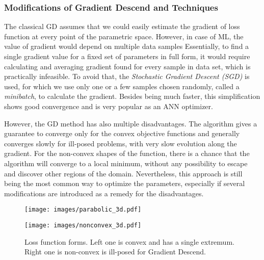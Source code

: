 \subsubsection{Modifications of Gradient Descend and Techniques}

The classical GD assumes that we could easily estimate the gradient of loss function at every point of the parametric space.
However, in case of ML, the value of gradient would depend on multiple data samples
Essentially, to find a single gradient value for a fixed set of parameters in full form, it would require calculating and averaging gradient found for every sample in data set, which is practically infeasible.
To avoid that, the \emph{Stochastic Gradient Descent (SGD)} is used, for which we use only one or a few samples chosen randomly, called a \emph{minibatch}, to calculate the gradient.
Besides being much faster, this simplification shows good convergence and is very popular as an ANN optimizer\cite{bibl:gd-over}.
\medskip

However, the GD method has also multiple disadvantages.
The algorithm gives a guarantee to converge only for the convex objective functions and generally converges slowly for ill-posed problems, with very slow evolution along the gradient.
For the non-convex shapes of the function, there is a chance that the algorithm will converge to a local minimum, without any possibility to escape and discover other regions of the domain\cite{bibl:gd-over}.
Nevertheless, this approach is still being the most common way to optimize the parameters, especially if several modifications are introduced as a remedy for the disadvantages.
\begin{figure}[h]
	\begin{multicols}{2}
		\texttt{[image: images/parabolic\_3d.pdf]}\par
		\texttt{[image: images/nonconvex\_3d.pdf]}\par
	\end{multicols}
	\caption{Loss function forms. Left one is convex and has a single extremum. Right one is non-convex is ill-posed for Gradient Descend. }
	\label{fig:lossfunc_demo}
\end{figure}
\medskip

